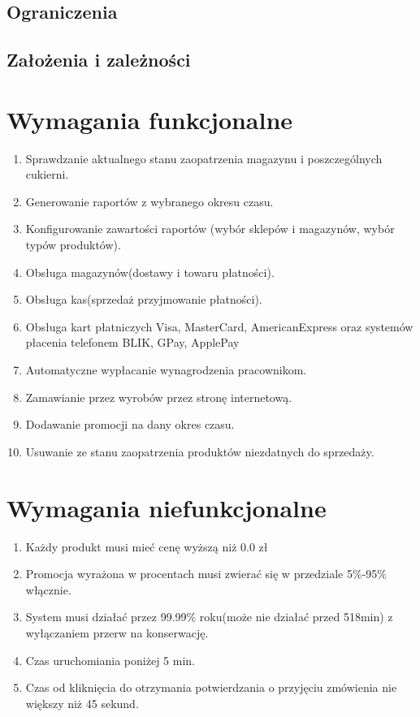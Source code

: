 \documentclass[16pt,a4paper]{article}
\begin{document}
\subsection{Ograniczenia}

\subsection{Założenia i zależności}
\section{Wymagania funkcjonalne}
\begin{enumerate}
\item Sprawdzanie aktualnego stanu zaopatrzenia magazynu i poszczególnych cukierni.
\item Generowanie raportów z wybranego okresu czasu.
\item Konfigurowanie zawartości raportów (wybór sklepów i magazynów, wybór typów produktów).
\item Obsługa magazynów(dostawy i towaru płatności).
\item Obsługa kas(sprzedaż przyjmowanie płatności).
\item Obsługa kart płatniczych Visa, MasterCard, AmericanExpress oraz systemów płacenia telefonem BLIK, GPay, ApplePay
\item Automatyczne wypłacanie wynagrodzenia pracownikom.
\item Zamawianie przez wyrobów przez stronę internetową.
\item Dodawanie promocji na dany okres czasu.
\item Usuwanie ze stanu zaopatrzenia produktów niezdatnych do sprzedaży.
\end{enumerate}
\section{Wymagania niefunkcjonalne}
\begin{enumerate}
\item Każdy produkt musi mieć cenę wyższą niż 0.0 zł
\item Promocja wyrażona w procentach musi zwierać się w przedziale 5\%-95\% włącznie.
\item System musi działać przez 99.99\% roku(może nie działać przed 518min) z wyłączaniem przerw na konserwację.
\item Czas uruchomiania poniżej 5 min.
\item Czas od kliknięcia do otrzymania potwierdzania o przyjęciu zmówienia nie większy niż 45 sekund. 
\end{enumerate}
\end{document}

